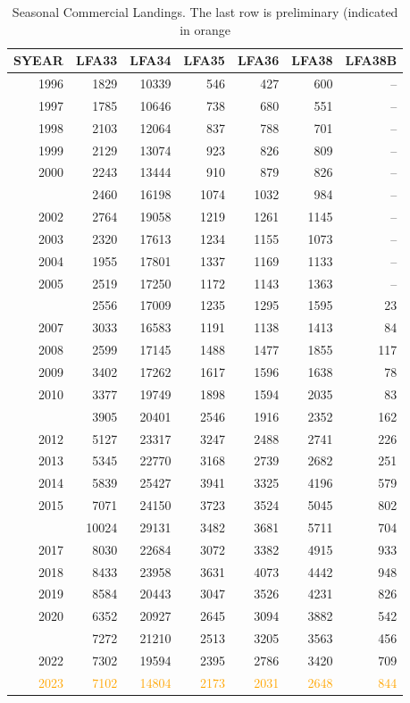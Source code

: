 \documentclass[
]{article}
\begin{document}
\newpage
\begin{table}

\caption{\label{tab:unnamed-chunk-12}Seasonal Commercial Landings. The last row is preliminary (indicated in orange}
\centering
\begin{tabular}[t]{rrrrrrr}
\toprule
SYEAR & LFA33 & LFA34 & LFA35 & LFA36 & LFA38 & LFA38B\\
\midrule
1996 & 1829 & 10339 & 546 & 427 & 600 & --\\
1997 & 1785 & 10646 & 738 & 680 & 551 & --\\
1998 & 2103 & 12064 & 837 & 788 & 701 & --\\
1999 & 2129 & 13074 & 923 & 826 & 809 & --\\
2000 & 2243 & 13444 & 910 & 879 & 826 & --\\
\addlinespace
2001 & 2460 & 16198 & 1074 & 1032 & 984 & --\\
2002 & 2764 & 19058 & 1219 & 1261 & 1145 & --\\
2003 & 2320 & 17613 & 1234 & 1155 & 1073 & --\\
2004 & 1955 & 17801 & 1337 & 1169 & 1133 & --\\
2005 & 2519 & 17250 & 1172 & 1143 & 1363 & --\\
\addlinespace
2006 & 2556 & 17009 & 1235 & 1295 & 1595 & 23\\
2007 & 3033 & 16583 & 1191 & 1138 & 1413 & 84\\
2008 & 2599 & 17145 & 1488 & 1477 & 1855 & 117\\
2009 & 3402 & 17262 & 1617 & 1596 & 1638 & 78\\
2010 & 3377 & 19749 & 1898 & 1594 & 2035 & 83\\
\addlinespace
2011 & 3905 & 20401 & 2546 & 1916 & 2352 & 162\\
2012 & 5127 & 23317 & 3247 & 2488 & 2741 & 226\\
2013 & 5345 & 22770 & 3168 & 2739 & 2682 & 251\\
2014 & 5839 & 25427 & 3941 & 3325 & 4196 & 579\\
2015 & 7071 & 24150 & 3723 & 3524 & 5045 & 802\\
\addlinespace
2016 & 10024 & 29131 & 3482 & 3681 & 5711 & 704\\
2017 & 8030 & 22684 & 3072 & 3382 & 4915 & 933\\
2018 & 8433 & 23958 & 3631 & 4073 & 4442 & 948\\
2019 & 8584 & 20443 & 3047 & 3526 & 4231 & 826\\
2020 & 6352 & 20927 & 2645 & 3094 & 3882 & 542\\
\addlinespace
2021 & 7272 & 21210 & 2513 & 3205 & 3563 & 456\\
2022 & 7302 & 19594 & 2395 & 2786 & 3420 & 709\\
\textcolor{orange}{2023} & \textcolor{orange}{7102} & \textcolor{orange}{14804} & \textcolor{orange}{2173} & \textcolor{orange}{2031} & \textcolor{orange}{2648} & \textcolor{orange}{844}\\
\bottomrule
\end{tabular}
\end{table}
\end{document}
